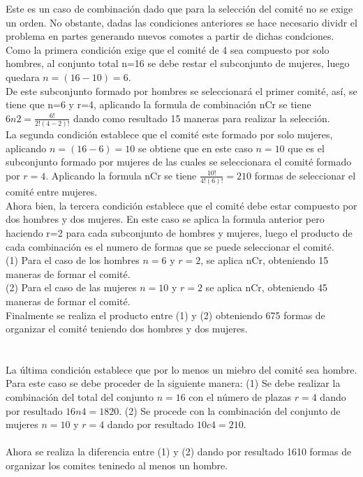 \documentclass[12pt]{article}
\begin{document}
Este es un caso de combinación dado que para la selección del comité no se exige un orden. No obstante, dadas las condiciones anteriores se hace necesario dividr el problema en partes generando nuevos comotes a partir de dichas condciones. Como la primera condición exige que el comité de 4 sea compuesto por solo hombres, al conjunto total n=16 se debe restar el subconjunto de mujeres, luego quedara $n=(16-10)=6$.\\

De este subconjunto formado por hombres se seleccionará el primer comité, así, se tiene que n=6 y r=4, aplicando la formula de combinación nCr se tiene $6n2=\frac{6!}{2!(4-2)!}$ dando como resultado 15 maneras para realizar la selección.\\

La segunda condición establece que el comité este formado por solo mujeres, aplicando $n=(16-6)=10$ se obtiene que en este caso $n=10$ que es el subconjunto formado por mujeres de las cuales se seleccionara el comité formado por $r=4$. Aplicando la formula nCr se tiene $\frac{10!}{4!(6)!} = 210$ formas de seleccionar el comité entre mujeres.\\

Ahora bien, la tercera condición establece que el comité debe estar compuesto por dos hombres y dos mujeres. En este caso se aplica la formula anterior pero haciendo r=2 para cada subconjunto de hombres y mujeres, luego el producto de cada combinación es el numero de formas que se puede seleccionar el comité.\\

(1)	Para el caso de los hombres $n=6$ y $r=2$, se aplica nCr, obteniendo  15 maneras de formar el comité.\\
(2)	Para el caso de las mujeres $n=10$ y $r=2$ se aplica nCr, obteniendo 45 maneras de formar el comité.\\
Finalmente se realiza el producto entre (1) y (2) obteniendo 675 formas de organizar el comité teniendo dos hombres y dos mujeres.\\
\\\\La última condición establece que por lo menos un miebro del comité sea hombre. Para este caso se debe proceder de la siguiente manera: (1) Se debe realizar la combinación del total del conjunto $n=16$ con el número de plazas $r=4$ dando por resultado $16n4=1820$. (2) Se procede con la combinación del conjunto de mujeres $n=10$ y $r=4$ dando por resultado $10c4=210$.
\\\\Ahora se realiza la diferencia entre (1) y (2) dando por resultado 1610 formas de organizar los comites teninedo al menos un hombre.\\
    
\end{document}
